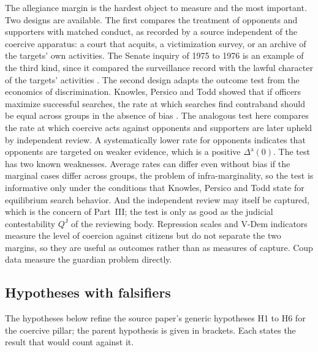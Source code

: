 \documentclass[11pt,letterpaper]{article}
\theoremstyle{definition}
\theoremstyle{remark}
\newcommand{\pJ}{\mathsf{J}}
\begin{document}
The allegiance margin is the hardest object to measure and the most important. Two designs are available. The first compares the treatment of opponents and supporters with matched conduct, as recorded by a source independent of the coercive apparatus: a court that acquits, a victimization survey, or an archive of the targets' own activities. The Senate inquiry of 1975 to 1976 is an example of the third kind, since it compared the surveillance record with the lawful character of the targets' activities \citep{church1976}. The second design adapts the outcome test from the economics of discrimination. Knowles, Persico and Todd showed that if officers maximize successful searches, the rate at which searches find contraband should be equal across groups in the absence of bias \citep{knowles2001}. The analogous test here compares the rate at which coercive acts against opponents and supporters are later upheld by independent review. A systematically lower rate for opponents indicates that opponents are targeted on weaker evidence, which is a positive $\Delta^{\mathrm{a}}(0)$. The test has two known weaknesses. Average rates can differ even without bias if the marginal cases differ across groups, the problem of infra-marginality, so the test is informative only under the conditions that Knowles, Persico and Todd state for equilibrium search behavior. And the independent review may itself be captured, which is the concern of Part~III; the test is only as good as the judicial contestability $Q^{\pJ}$ of the reviewing body. Repression scales \citep{poe1994,hill2014} and V-Dem indicators \citep{coppedge2011} measure the level of coercion against citizens but do not separate the two margins, so they are useful as outcomes rather than as measures of capture. Coup data \citep{powell2011} measure the guardian problem directly.

\subsection{Hypotheses with falsifiers}

The hypotheses below refine the source paper's generic hypotheses H1 to H6 for the coercive pillar; the parent hypothesis is given in brackets. Each states the result that would count against it.
\end{document}
